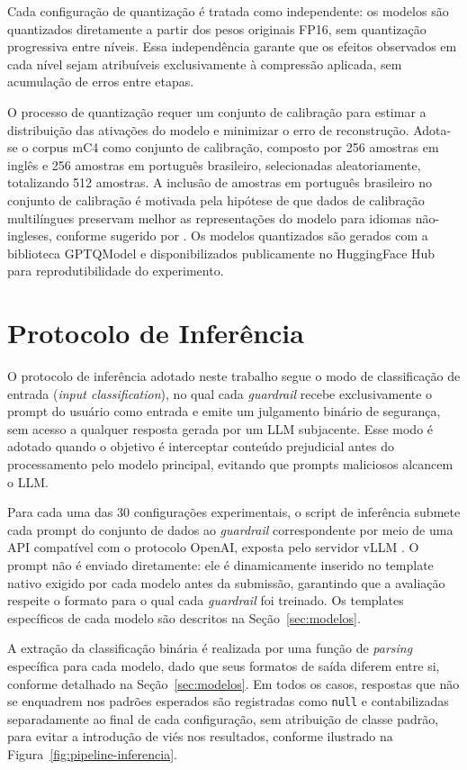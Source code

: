 Cada configuração de quantização é tratada como independente: os modelos são quantizados diretamente a partir dos pesos originais FP16, sem quantização progressiva entre níveis. Essa independência garante que os efeitos observados em cada nível sejam atribuíveis exclusivamente à compressão aplicada, sem acumulação de erros entre etapas.

O processo de quantização requer um conjunto de calibração para estimar a distribuição das ativações do modelo e minimizar o erro de reconstrução. Adota-se o corpus mC4 \cite{raffel2020exploring} como conjunto de calibração, composto por 256 amostras em inglês e 256 amostras em português brasileiro, selecionadas aleatoriamente, totalizando 512 amostras. A inclusão de amostras em português brasileiro no conjunto de calibração é motivada pela hipótese de que dados de calibração multilíngues preservam melhor as representações do modelo para idiomas não-ingleses, conforme sugerido por . Os modelos quantizados são gerados com a biblioteca GPTQModel e disponibilizados publicamente no HuggingFace Hub para reprodutibilidade do experimento.

\section{Protocolo de Inferência}
\label{sec:protocolo}

O protocolo de inferência adotado neste trabalho segue o modo de classificação de entrada (\textit{input classification}), no qual cada \textit{guardrail} recebe exclusivamente o prompt do usuário como entrada e emite um julgamento binário de segurança, sem acesso a qualquer resposta gerada por um LLM subjacente. Esse modo é adotado quando o objetivo é interceptar conteúdo prejudicial antes do processamento pelo modelo principal, evitando que prompts maliciosos alcancem o LLM.

Para cada uma das 30 configurações experimentais, o script de inferência submete cada prompt do conjunto de dados ao \textit{guardrail} correspondente por meio de uma API compatível com o protocolo OpenAI, exposta pelo servidor vLLM \cite{kwon2023vllm}. O prompt não é enviado diretamente: ele é dinamicamente inserido no template nativo exigido por cada modelo antes da submissão, garantindo que a avaliação respeite o formato para o qual cada \textit{guardrail} foi treinado. Os templates específicos de cada modelo são descritos na Seção~\ref{sec:modelos}.

A extração da classificação binária é realizada por uma função de \textit{parsing} específica para cada modelo, dado que seus formatos de saída diferem entre si, conforme detalhado na Seção~\ref{sec:modelos}. Em todos os casos, respostas que não se enquadrem nos padrões esperados são registradas como \texttt{null} e contabilizadas separadamente ao final de cada configuração, sem atribuição de classe padrão, para evitar a introdução de viés nos resultados, conforme ilustrado na Figura~\ref{fig:pipeline-inferencia}.

